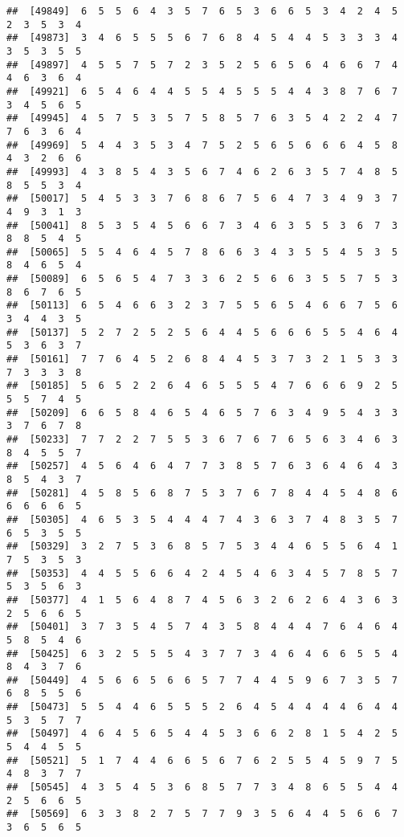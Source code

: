 \documentclass[
]{book}
\begin{document}
\begin{verbatim}
##  [49849]  6  5  5  6  4  3  5  7  6  5  3  6  6  5  3  4  2  4  5  2  3  5  3  4
##  [49873]  3  4  6  5  5  5  6  7  6  8  4  5  4  4  5  3  3  3  4  3  5  3  5  5
##  [49897]  4  5  5  7  5  7  2  3  5  2  5  6  5  6  4  6  6  7  4  4  6  3  6  4
##  [49921]  6  5  4  6  4  4  5  5  4  5  5  5  4  4  3  8  7  6  7  3  4  5  6  5
##  [49945]  4  5  7  5  3  5  7  5  8  5  7  6  3  5  4  2  2  4  7  7  6  3  6  4
##  [49969]  5  4  4  3  5  3  4  7  5  2  5  6  5  6  6  6  4  5  8  4  3  2  6  6
##  [49993]  4  3  8  5  4  3  5  6  7  4  6  2  6  3  5  7  4  8  5  8  5  5  3  4
##  [50017]  5  4  5  3  3  7  6  8  6  7  5  6  4  7  3  4  9  3  7  4  9  3  1  3
##  [50041]  8  5  3  5  4  5  6  6  7  3  4  6  3  5  5  3  6  7  3  8  8  5  4  5
##  [50065]  5  5  4  6  4  5  7  8  6  6  3  4  3  5  5  4  5  3  5  8  4  6  5  4
##  [50089]  6  5  6  5  4  7  3  3  6  2  5  6  6  3  5  5  7  5  3  8  6  7  6  5
##  [50113]  6  5  4  6  6  3  2  3  7  5  5  6  5  4  6  6  7  5  6  3  4  4  3  5
##  [50137]  5  2  7  2  5  2  5  6  4  4  5  6  6  6  5  5  4  6  4  5  3  6  3  7
##  [50161]  7  7  6  4  5  2  6  8  4  4  5  3  7  3  2  1  5  3  3  7  3  3  3  8
##  [50185]  5  6  5  2  2  6  4  6  5  5  5  4  7  6  6  6  9  2  5  5  5  7  4  5
##  [50209]  6  6  5  8  4  6  5  4  6  5  7  6  3  4  9  5  4  3  3  3  7  6  7  8
##  [50233]  7  7  2  2  7  5  5  3  6  7  6  7  6  5  6  3  4  6  3  8  4  5  5  7
##  [50257]  4  5  6  4  6  4  7  7  3  8  5  7  6  3  6  4  6  4  3  8  5  4  3  7
##  [50281]  4  5  8  5  6  8  7  5  3  7  6  7  8  4  4  5  4  8  6  6  6  6  6  5
##  [50305]  4  6  5  3  5  4  4  4  7  4  3  6  3  7  4  8  3  5  7  6  5  3  5  5
##  [50329]  3  2  7  5  3  6  8  5  7  5  3  4  4  6  5  5  6  4  1  7  5  3  5  3
##  [50353]  4  4  5  5  6  6  4  2  4  5  4  6  3  4  5  7  8  5  7  5  3  5  6  3
##  [50377]  4  1  5  6  4  8  7  4  5  6  3  2  6  2  6  4  3  6  3  2  5  6  6  5
##  [50401]  3  7  3  5  4  5  7  4  3  5  8  4  4  4  7  6  4  6  4  5  8  5  4  6
##  [50425]  6  3  2  5  5  5  4  3  7  7  3  4  6  4  6  6  5  5  4  8  4  3  7  6
##  [50449]  4  5  6  6  5  6  6  5  7  7  4  4  5  9  6  7  3  5  7  6  8  5  5  6
##  [50473]  5  5  4  4  6  5  5  5  2  6  4  5  4  4  4  4  6  4  4  5  3  5  7  7
##  [50497]  4  6  4  5  6  5  4  4  5  3  6  6  2  8  1  5  4  2  5  5  4  4  5  5
##  [50521]  5  1  7  4  4  6  6  5  6  7  6  2  5  5  4  5  9  7  5  4  8  3  7  7
##  [50545]  4  3  5  4  5  3  6  8  5  7  7  3  4  8  6  5  5  4  4  2  5  6  6  5
##  [50569]  6  3  3  8  2  7  5  7  7  9  3  5  6  4  4  5  6  6  7  3  6  5  6  5

\end{verbatim}
\end{document}

